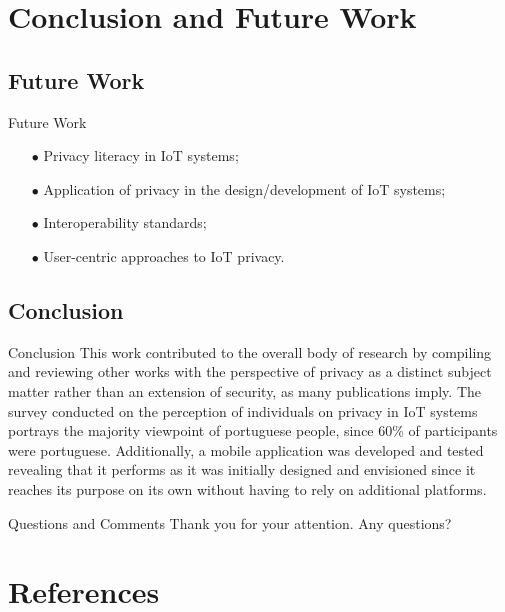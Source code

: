 \documentclass[xcolor={svgnames},compress,aspectratio=169]{beamer}
\begin{document}
\section{Conclusion and Future Work}

\subsection{Future Work}

\begin{frame}{Future Work}
    \begin{itemize}
        \item[$\bullet$]
        Privacy literacy in IoT systems;
        \item[$\bullet$]
        Application of privacy in the design/development of IoT systems;
        \item[$\bullet$]
        Interoperability standards;
        \item[$\bullet$]
        User-centric approaches to IoT privacy.
    \end{itemize}
\end{frame}


\subsection{Conclusion}

\begin{frame}{Conclusion}
    This work contributed to the overall body of research by compiling and reviewing
    other works with the perspective of privacy as a distinct subject matter rather than
    an extension of security, as many publications imply. The survey conducted
    on the perception of individuals on privacy in IoT systems portrays the majority
    viewpoint of portuguese people, since 60\% of participants were portuguese. Additionally,
    a mobile application was developed and tested revealing that it performs as it was
    initially designed and envisioned since it reaches its purpose on its own without having
    to rely on additional platforms.
\end{frame}


\begin{frame}{Questions and Comments}
    Thank you for your attention. Any questions?
\end{frame}


\section*{References}

\begin{frame}[allowframebreaks]
    
    
\end{frame}
\end{document}
